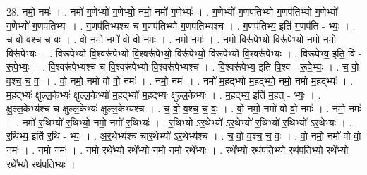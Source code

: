 \documentclass[17pt]{extarticle}
\begin{document}
28. नमो॒ नमः॑ । . नमो॑ ग॒णेभ्यो॑ ग॒णेभ्यो॒ नमो॒ नमो॑ ग॒णेभ्यः॑ । . ग॒णेभ्यो॑ ग॒णप॑तिभ्यो ग॒णप॑तिभ्यो ग॒णेभ्यो॑ ग॒णेभ्यो॑ ग॒णप॑तिभ्यः । . ग॒णप॑तिभ्यश्च च ग॒णप॑तिभ्यो ग॒णप॑तिभ्यश्च । . ग॒णप॑तिभ्य॒ इति॑ ग॒णप॑ति - भ्यः॒ । . च॒ वो॒ व॒श्च॒ च॒ वः॒ । . वो॒ नमो॒ नमो॑ वो वो॒ नमः॑ । . नमो॒ नमः॑ । . नमो॒ विरू॑पेभ्यो॒ विरू॑पेभ्यो॒ नमो॒ नमो॒ विरू॑पेभ्यः । . विरू॑पेभ्यो वि॒श्वरू॑पेभ्यो वि॒श्वरू॑पेभ्यो॒ विरू॑पेभ्यो॒ विरू॑पेभ्यो वि॒श्वरू॑पेभ्यः । . विरू॑पेभ्य॒ इति॒ वि - रू॒पे॒भ्यः॒ । . वि॒श्वरू॑पेभ्यश्च च वि॒श्वरू॑पेभ्यो वि॒श्वरू॑पेभ्यश्च । . वि॒श्वरू॑पेभ्य॒ इति॑ वि॒श्व - रू॒पे॒भ्यः॒ । . च॒ वो॒ व॒श्च॒ च॒ वः॒ । . वो॒ नमो॒ नमो॑ वो वो॒ नमः॑ । . नमो॒ नमः॑ । . नमो॑ म॒हद्भ्यो॑ म॒हद्भ्यो॒ नमो॒ नमो॑ म॒हद्भ्यः॑ । . म॒हद्भ्यः॑ क्षुल्ल॒केभ्यः॑ क्षुल्ल॒केभ्यो॑ म॒हद्भ्यो॑ म॒हद्भ्यः॑ क्षुल्ल॒केभ्यः॑ । . म॒हद्भ्य॒ इति॑ म॒हत् - भ्यः॒ । . क्षु॒ल्ल॒केभ्य॑श्च च क्षुल्ल॒केभ्यः॑ क्षुल्ल॒केभ्य॑श्च । . च॒ वो॒ व॒श्च॒ च॒ वः॒ । . वो॒ नमो॒ नमो॑ वो वो॒ नमः॑ । . नमो॒ नमः॑ । . नमो॑ र॒थिभ्यो॑ र॒थिभ्यो॒ नमो॒ नमो॑ र॒थिभ्यः॑ । . र॒थिभ्यो॑ ऽर॒थेभ्यो॑ ऽर॒थेभ्यो॑ र॒थिभ्यो॑ र॒थिभ्यो॑ ऽर॒थेभ्यः॑ । . र॒थिभ्य॒ इति॑ र॒थि - भ्यः॒ । . अ॒र॒थेभ्य॑श्च चार॒थेभ्यो॑ ऽर॒थेभ्य॑श्च । . च॒ वो॒ व॒श्च॒ च॒ वः॒ । . वो॒ नमो॒ नमो॑ वो वो॒ नमः॑ । . नमो॒ नमः॑ । . नमो॒ रथे᳚भ्यो॒ रथे᳚भ्यो॒ नमो॒ नमो॒ रथे᳚भ्यः । . रथे᳚भ्यो॒ रथ॑पतिभ्यो॒ रथ॑पतिभ्यो॒ रथे᳚भ्यो॒ रथे᳚भ्यो॒ रथ॑पतिभ्यः । \newline
\end{document}
